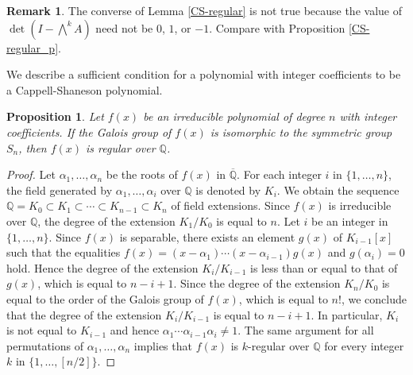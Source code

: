\documentclass{amsart}
\theoremstyle{plain}
\newtheorem{cor}[thm]{Corollary}
\newtheorem{prop}[thm]{Proposition}
\theoremstyle{definition}
\newtheorem{rem}[thm]{Remark}
\theoremstyle{remark}
\begin{document}
\begin{rem}
The converse of Lemma \ref{CS-regular} is not true because the value of $\det(I-\bigwedge^kA)$ 
need not be $0$, $1$, or $-1$. Compare with Proposition \ref{CS-regular_p}. 
\end{rem}


We describe a sufficient condition for a polynomial with integer coefficients to be a Cappell-Shaneson 
polynomial. 

\begin{prop}
Let $f(x)$ be an irreducible polynomial of degree $n$ with integer coefficients. 
If the Galois group of $f(x)$ is isomorphic to the symmetric group $S_n$, 
then $f(x)$ is regular over $\mathbb{Q}$. 
\end{prop}

\begin{proof}
Let $\alpha_1,\ldots ,\alpha_n$ be the roots of $f(x)$ in $\overline{\mathbb{Q}}$. 
For each integer $i$ in $\{1,\ldots ,n\}$, the field generated by $\alpha_1,\ldots ,\alpha_i$ 
over $\mathbb{Q}$ is denoted by $K_i$. We obtain the sequence 
$\mathbb{Q}=K_0\subset K_1\subset\cdots\subset K_{n-1}\subset K_n$ of field extensions. 
Since $f(x)$ is irreducible over $\mathbb{Q}$, the degree of the extension 
$K_1/K_0$ is equal to $n$. Let $i$ be an integer in $\{1,\ldots ,n\}$. 
Since $f(x)$ is separable, there exists an element $g(x)$ of $K_{i-1}[x]$ such that 
the equalities $f(x)=(x-\alpha_1)\cdots (x-\alpha_{i-1})g(x)$ and $g(\alpha_i)=0$ hold. 
Hence the degree of the extension $K_i/K_{i-1}$ is less than or equal to 
that of $g(x)$, which is equal to $n-i+1$. Since the degree of the extension $K_n/K_0$ 
is equal to the order of the Galois group of $f(x)$, which is equal to $n!$, we conclude that 
the degree of the extension $K_i/K_{i-1}$ is equal to $n-i+1$. 
In particular, $K_i$ is not equal to $K_{i-1}$ and hence 
$\alpha_1\cdots\alpha_{i-1}\alpha_i\ne 1$. 
The same argument for all permutations of $\alpha_1,\ldots ,\alpha_n$ implies that 
$f(x)$ is $k$-regular over $\mathbb{Q}$ for every integer $k$ in $\{1,\ldots ,[n/2]\}$. 
\end{proof}

\end{document}
